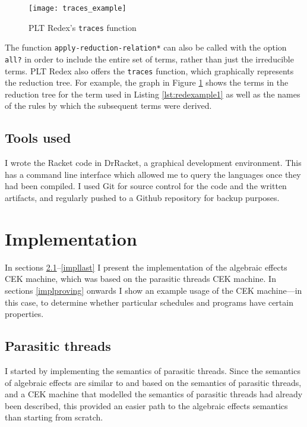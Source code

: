 \documentclass[12pt,a4paper,twoside,openright]{report}
\begin{document}
\begin{figure}
\centering
\caption{PLT Redex's \texttt{traces} function}
\label{fig:traces_example}
\texttt{[image: traces\_example]}
\end{figure}

The function \texttt{apply-reduction-relation*} can also be called with the option \texttt{all?} in order to include the entire set of terms, rather than just the irreducible terms. PLT Redex also offers the \texttt{traces} function, which graphically represents the reduction tree. For example, the graph in Figure \ref{fig:traces_example} shows the terms in the reduction tree for the term used in Listing \ref{lst:redexample1} as well as the names of the rules by which the subsequent terms were derived.

\section{Tools used}

I wrote the Racket code in DrRacket, a graphical development environment. This has a command line interface which allowed me to query the languages once they had been compiled. I used Git for source control for the code and the written artifacts, and regularly pushed to a Github repository for backup purposes.

\chapter{Implementation}

In sections \ref{implfirst}--\ref{impllast} I present the implementation of the algebraic effects CEK machine, which was based on the parasitic threads CEK machine. In sections \ref{implproving} onwards I show an example usage of the CEK machine---in this case, to determine whether particular schedules and programs have certain properties.

\section{Parasitic threads}\label{implfirst}

I started by implementing the semantics of parasitic threads. Since the semantics of algebraic effects are similar to and based on the semantics of parasitic threads, and a CEK machine that modelled the semantics of parasitic threads had already been described,\cite{Siv2014} this provided an easier path to the algebraic effects semantics than starting from scratch.
\end{document}
